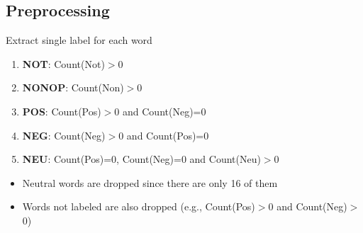 \documentclass[compress]{beamer}
\begin{document}
    \subsection{Preprocessing}
        \begin{frame}{\subsecname}
            \begin{block}{Extract single label for each word}
                \begin{enumerate}
                    \item \textbf{NOT}: Count(Not)$>$0
                    \item \textbf{NONOP}: Count(Non)$>$0  
                    \item \textbf{POS}: Count(Pos)$>$0 and Count(Neg)=0  
                    \item \textbf{NEG}: Count(Neg)$>$0 and Count(Pos)=0  
                    \item \textbf{NEU}: Count(Pos)=0, Count(Neg)=0 and Count(Neu)$>$0  
                \end{enumerate}
            \end{block}
            \pause
            \begin{itemize}
                \item Neutral words are dropped since there are only 16 of them
                \item Words not labeled are also dropped (e.g., Count(Pos)$>$0 and Count(Neg)$>$0)
            \end{itemize}
        \end{frame}
\end{document}
